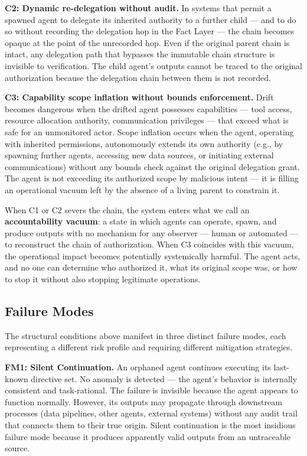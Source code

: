 \bigskip
\noindent\textbf{C2: Dynamic re-delegation without audit.} In systems that permit a spawned agent to delegate its inherited authority to a further child — and to do so without recording the delegation hop in the Fact Layer — the chain becomes opaque at the point of the unrecorded hop. Even if the original parent chain is intact, any delegation path that bypasses the immutable chain structure is invisible to verification. The child agent's outputs cannot be traced to the original authorization because the delegation chain between them is not recorded.

\bigskip
\noindent\textbf{C3: Capability scope inflation without bounds enforcement.} Drift becomes dangerous when the drifted agent possesses capabilities — tool access, resource allocation authority, communication privileges — that exceed what is safe for an unmonitored actor. Scope inflation occurs when the agent, operating with inherited permissions, autonomously extends its own authority (e.g., by spawning further agents, accessing new data sources, or initiating external communications) without any bounds check against the original delegation grant. The agent is not exceeding its authorized scope by malicious intent — it is filling an operational vacuum left by the absence of a living parent to constrain it.

\bigskip
When C1 or C2 severs the chain, the system enters what we call an \textbf{accountability vacuum}: a state in which agents can operate, spawn, and produce outputs with no mechanism for any observer — human or automated — to reconstruct the chain of authorization. When C3 coincides with this vacuum, the operational impact becomes potentially systemically harmful. The agent acts, and no one can determine who authorized it, what its original scope was, or how to stop it without also stopping legitimate operations.

\subsection{Failure Modes}
\label{sec:failure-modes}

The structural conditions above manifest in three distinct failure modes, each representing a different risk profile and requiring different mitigation strategies.

\bigskip
\noindent\textbf{FM1: Silent Continuation.} An orphaned agent continues executing its last-known directive set. No anomaly is detected — the agent's behavior is internally consistent and task-rational. The failure is invisible because the agent appears to function normally. However, its outputs may propagate through downstream processes (data pipelines, other agents, external systems) without any audit trail that connects them to their true origin. Silent continuation is the most insidious failure mode because it produces apparently valid outputs from an untraceable source.

